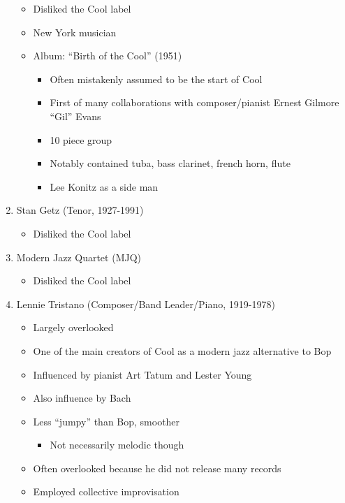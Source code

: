 \documentclass[]{article}
\providecommand{\tightlist}{%
  \setlength{\itemsep}{0pt}\setlength{\parskip}{0pt}}
\begin{document}
\begin{enumerate}
  \begin{itemize}
  \tightlist
  \item
    Disliked the Cool label
  \item
    New York musician
  \item
    Album: ``Birth of the Cool'' (1951)

    \begin{itemize}
    \tightlist
    \item
      Often mistakenly assumed to be the start of Cool
    \item
      First of many collaborations with composer/pianist Ernest Gilmore
      ``Gil'' Evans
    \item
      10 piece group
    \item
      Notably contained tuba, bass clarinet, french horn, flute
    \item
      Lee Konitz as a side man
    \end{itemize}
  \end{itemize}
\item
  Stan Getz (Tenor, 1927-1991)

  \begin{itemize}
  \tightlist
  \item
    Disliked the Cool label
  \end{itemize}
\item
  Modern Jazz Quartet (MJQ)

  \begin{itemize}
  \tightlist
  \item
    Disliked the Cool label
  \end{itemize}
\item
  Lennie Tristano (Composer/Band Leader/Piano, 1919-1978)

  \begin{itemize}
  \tightlist
  \item
    Largely overlooked
  \item
    One of the main creators of Cool as a modern jazz alternative to Bop
  \item
    Influenced by pianist Art Tatum and Lester Young
  \item
    Also influence by Bach
  \item
    Less ``jumpy'' than Bop, smoother

    \begin{itemize}
    \tightlist
    \item
      Not necessarily melodic though
    \end{itemize}
  \item
    Often overlooked because he did not release many records
  \item
    Employed collective improvisation


\end{itemize}
\end{enumerate}
\end{document}
